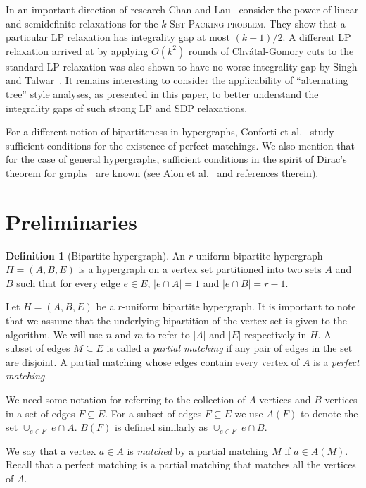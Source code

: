 \documentclass[11pt]{article}
\theoremstyle{definition}
\newtheorem{definition}[theorem]{Definition}
\theoremstyle{remark}
\newcommand{\problemmacro}[1]{\texorpdfstring{\textsc{#1}}{#1}\xspace}
\begin{document}
In an important direction of research Chan and
Lau~\cite{chan2012linear} consider the power of linear and
semidefinite relaxations for the \problemmacro{$k$-Set Packing
  problem}. They show that a particular LP relaxation has integrality
gap at most $(k+1)/2$. A different LP relaxation arrived at by
applying $O(k^2)$ rounds of Chv\'atal-Gomory cuts to the standard LP
relaxation was also shown to have no worse integrality gap by Singh
and Talwar~\cite{singh2010improving}. It remains interesting to
consider the applicability of ``alternating tree'' style analyses, as
presented in this paper, to better understand the integrality gaps of
such strong LP and SDP relaxations.

For a different notion of bipartiteness in hypergraphs, Conforti
et al.~\cite{conforti1996perfect} study sufficient conditions for the
existence of perfect matchings. We also mention that for the case of
general hypergraphs, sufficient conditions in the spirit of Dirac's
theorem for graphs~\cite{dirac1952some} are known (see Alon
et al.~\cite{alon2012large} and references therein).

\section{Preliminaries}\label{section:preliminaries}
\begin{definition}[Bipartite hypergraph]
  An $r$-uniform bipartite hypergraph $H = (A, B, E)$ is a hypergraph
  on a vertex set partitioned into two sets $A$ and $B$ such that for
  every edge $e \in E$, $|e \cap A| = 1$ and $|e \cap B| = r-1$.
\end{definition}

Let $H=(A,B,E)$ be a $r$-uniform bipartite hypergraph. It is important
to note that we assume that the underlying bipartition of the vertex set is given
to the algorithm. We will
use $n$ and $m$ to refer to $|A|$ and $|E|$ respectively in $H$. A
subset of edges $M \subseteq E$ is called a \textit{partial matching}
if any pair of edges in the set are disjoint. A partial matching whose
edges contain every vertex of $A$ is a \textit{perfect matching}.

We need some notation for referring to the collection of $A$ vertices
and $B$ vertices in a set of edges $F \subseteq E$. For a subset of
edges $F \subseteq E$ we use $A(F)$ to denote the set
$\cup_{e\in F} \; e \cap A.$ $B(F)$ is defined similarly as
$\cup_{e\in F} \; e \cap B$.

We say that a vertex $a \in A$ is \textit{matched} by a partial
matching $M$ if $a \in A(M)$. Recall that a perfect matching is a
partial matching that matches all the vertices of $A$.
\end{document}

